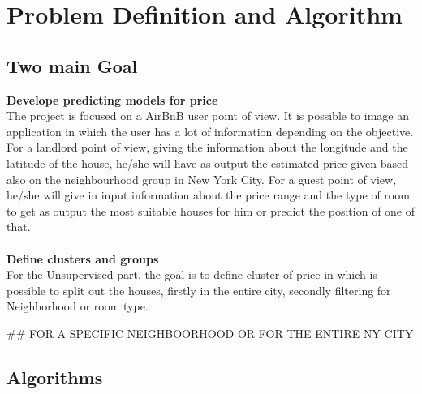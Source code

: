 \documentclass{FR16}
\begin{document}

\newpage
\section{Problem Definition and Algorithm}
\subsection{Two main Goal}
\textbf{Develope predicting models for price}\\
The project is focused on a AirBnB user point of view. It is possible to image an application in which the user has a lot of information depending on the objective. For a landlord point of view, giving the information about the longitude and the latitude of the house, he/she will have as output the estimated price given based also on the neighbourhood group in New York City. For a guest point of view, he/she will give in input information about the price range and the type of room to get as output the most suitable houses for him or predict the position of one of that.\\\\
\textbf{Define clusters and groups}\\
For the Unsupervised part, the goal is to define cluster of price in which is possible to split out the houses, firstly in the entire city, secondly filtering for Neighborhood or room type. 

\#\# FOR A SPECIFIC NEIGHBOORHOOD OR FOR THE ENTIRE NY CITY
\subsection{Algorithms}
\end{document}
